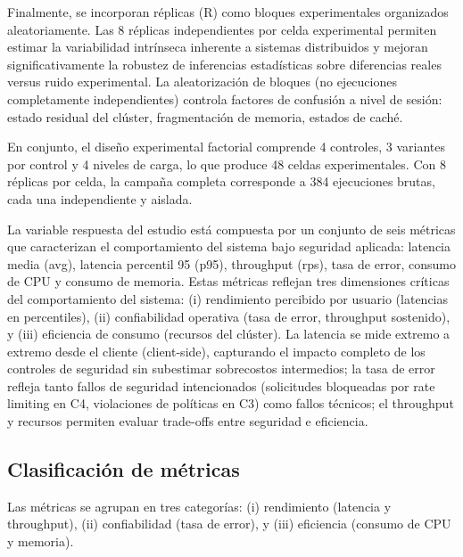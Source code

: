 Finalmente, se incorporan réplicas (R) como bloques experimentales organizados aleatoriamente. Las 8 réplicas independientes por celda experimental permiten estimar la variabilidad intrínseca inherente a sistemas distribuidos y mejoran significativamente la robustez de inferencias estadísticas sobre diferencias reales versus ruido experimental. La aleatorización de bloques (no ejecuciones completamente independientes) controla factores de confusión a nivel de sesión: estado residual del clúster, fragmentación de memoria, estados de caché.

En conjunto, el diseño experimental factorial comprende 4 controles, 3 variantes por control y 4 niveles de carga, lo que produce 48 celdas experimentales. Con 8 réplicas por celda, la campaña completa corresponde a 384 ejecuciones brutas, cada una independiente y aislada.

La variable respuesta del estudio está compuesta por un conjunto de seis métricas que caracterizan el comportamiento del sistema bajo seguridad aplicada: latencia media (avg), latencia percentil 95 (p95), throughput (rps), tasa de error, consumo de CPU y consumo de memoria. Estas métricas reflejan tres dimensiones críticas del comportamiento del sistema: (i) rendimiento percibido por usuario (latencias en percentiles), (ii) confiabilidad operativa (tasa de error, throughput sostenido), y (iii) eficiencia de consumo (recursos del clúster). La latencia se mide extremo a extremo desde el cliente (client-side), capturando el impacto completo de los controles de seguridad sin subestimar sobrecostos intermedios; la tasa de error refleja tanto fallos de seguridad intencionados (solicitudes bloqueadas por rate limiting en C4, violaciones de políticas en C3) como fallos técnicos; el throughput y recursos permiten evaluar trade-offs entre seguridad e eficiencia.

\subsection{Clasificación de métricas}

Las métricas se agrupan en tres categorías: (i) rendimiento (latencia y throughput), (ii) confiabilidad (tasa de error), y (iii) eficiencia (consumo de CPU y memoria).


